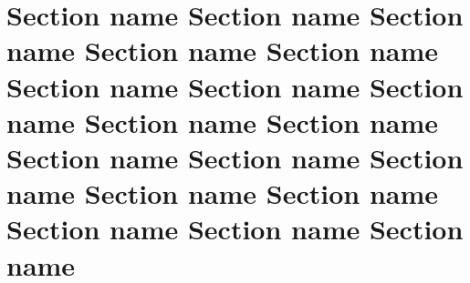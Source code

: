 \documentclass{beamer}
\begin{document}
\section{Section name Section name Section name Section name Section name Section name Section name Section name Section name Section name Section name Section name Section name Section name Section name Section name Section name Section name}
\end{document}
